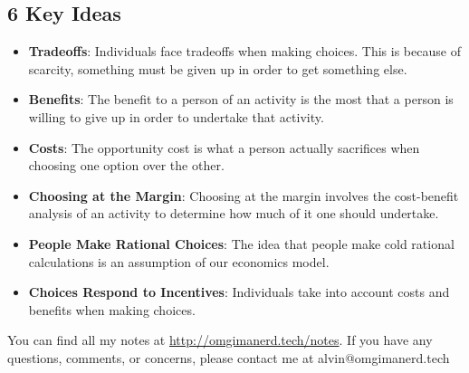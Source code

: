 \documentclass[letterpaper, 12pt]{article}
\begin{document}
\subsection*{6 Key Ideas}
\begin{itemize}
  \item \textbf{Tradeoffs}: Individuals face tradeoffs when making choices.
  This is because of scarcity, something must be given up in order to get
  something else.
  \item \textbf{Benefits}: The benefit to a person of an activity is the most
  that a person is willing to give up in order to undertake that activity.
  \item \textbf{Costs}: The opportunity cost is what a person actually
  sacrifices when choosing one option over the other.
  \item \textbf{Choosing at the Margin}: Choosing at the margin involves
  the cost-benefit analysis of an activity to determine how much of it one
  should undertake.
  \item \textbf{People Make Rational Choices}: The idea that people make cold
  rational calculations is an assumption of our economics model.
  \item \textbf{Choices Respond to Incentives}: Individuals take into account
  costs and benefits when making choices.
\end{itemize}

\begin{center}
  You can find all my notes at \url{http://omgimanerd.tech/notes}. If you have
  any questions, comments, or concerns, please contact me at
  alvin@omgimanerd.tech
\end{center}
\end{document}
